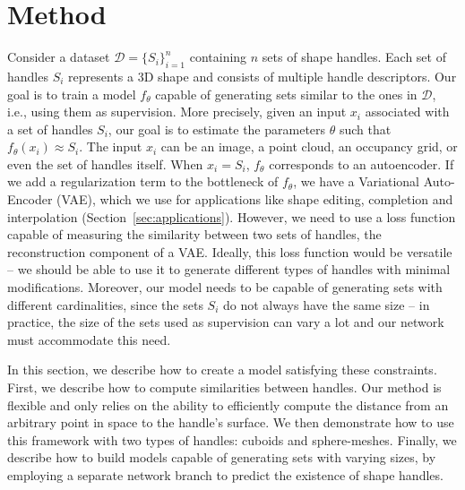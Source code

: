 \section{Method}
\label{sec:method}
Consider a dataset $\mathcal{D} = \{S_i\}_{i=1}^{n}$ containing $n$ sets of
shape handles.
Each set of handles $S_i$ represents a 3D shape and consists of multiple handle descriptors.
Our goal is to train a model $f_\theta$ capable of generating sets similar to the ones in
$\mathcal{D}$, i.e., using them as supervision.
More precisely, given an input $x_i$ associated with a set of handles $S_i$, our goal is to
estimate the parameters $\theta$ such that $f_\theta(x_i) \approx S_i$.
The input $x_i$ can be an image, a point cloud, an occupancy grid, or even the set of
handles itself.
When $x_i=S_i$, $f_\theta$ corresponds to an autoencoder.
If we add a regularization term to the bottleneck of $f_\theta$,
we have a Variational Auto-Encoder (VAE), which we use for
applications like shape editing, completion and interpolation (Section~\ref{sec:applications}).
However, we need to use a loss function capable of measuring the
similarity between two sets of handles, \ie the reconstruction component of a VAE.
Ideally, this loss function would be versatile -- we should be able to use it
to generate different types of handles with minimal modifications.
Moreover, our model needs to be capable of generating sets with different cardinalities,
since the sets $S_i$ do not always have the same size -- in practice,
the size of the sets used as supervision can vary a lot and our network must accommodate this need.

In this section, we describe how to create a model satisfying these constraints.
First, we describe how to compute similarities between handles.
Our method is flexible and only relies on the ability to efficiently compute the
distance from an arbitrary point in space to the handle's surface.
We then demonstrate how to use this framework with two types of handles:
cuboids and sphere-meshes.
Finally, we describe how to build models capable of generating sets with varying sizes, 
by employing a separate network branch to predict the existence of shape handles.


